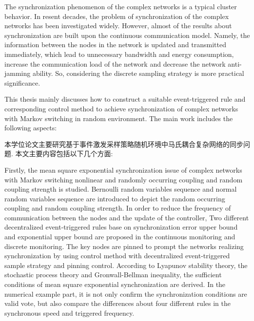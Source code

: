 \begin{englishabstract}
\vspace{4ex}
The synchronization phenomenon of the complex networks is a typical cluster behavior. In resent decades, the problem of synchronization of the complex networks has been investigated widely. However, almost of the results about synchronization are built upon the continuous communication model.  Namely, the information between the nodes in the network is updated and transmitted immediately, which lead to unnecessary bandwidth and energy consumption, increase the communication load of the network and decrease the network anti-jamming ability. So, considering the discrete sampling strategy is more practical significance.

This thesis mainly discusses how to construct a suitable event-triggered rule and corresponding control method to achieve synchronization of complex networks with Markov switching in random environment. The main work includes the following aspects:

本学位论文主要研究基于事件激发采样策略随机环境中马氏耦合复杂网络的同步问题. 本文主要内容包括以下几个方面:

Firstly, the mean square exponential synchronization issue of complex networks with Markov switching nonlinear and randomly occurring coupling and random coupling strength is studied. Bernoulli random variables sequence and normal random variables sequence are introduced to depict the random occurring coupling and random coupling strength. In order to reduce the frequency of communication between the nodes and the update of the controller, Two different decentralized event-triggered rules base on synchronization error upper bound and exponential upper bound are proposed in the continuous monitoring and discrete monitoring. The key nodes are pinned to prompt the networks realizing synchronization by using control method with decentralized event-triggered sample strategy and pinning control. According to Lyapunov stability theory, the stochastic process theory and Gronwall-Bellman inequality, the sufficient conditions of mean square exponential synchronization are derived. In the numerical example part, it is not only confirm the synchronization conditions are valid vote, but also compare the differences about four different rules in the synchronous speed and triggered frequency.


\end{englishabstract}
